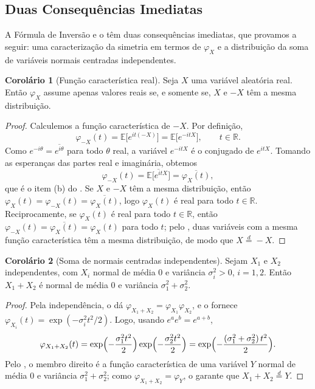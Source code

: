 \documentclass[12pt,portuguese]{article}
\theoremstyle{definition}
\newtheorem{corollary}[corollary]{Corolário}
\theoremstyle{plainexercise}
\theoremstyle{starredexercise}
\theoremstyle{definition}
\begin{document}
\subsection{Duas Consequências Imediatas}\label{subsec:consequencias-inversao}

A Fórmula de Inversão e o  têm duas consequências
imediatas, que provamos a seguir: uma caracterização da simetria em termos de
$\varphi_X$ e a distribuição da soma de variáveis normais centradas
independentes.

\begin{corollary}[Função característica real]\label{cor:fc-real}
Seja $X$ uma variável aleatória real. Então $\varphi_X$ assume apenas valores
reais se, e somente se, $X$ e $-X$ têm a mesma distribuição.
\end{corollary}

\begin{proof}
Calculemos a função característica de $-X$. Por definição,
\[
  \varphi_{-X}(t) = \mathbb{E}\bigl[e^{it(-X)}\bigr]
  = \mathbb{E}\bigl[e^{-itX}\bigr], \qquad t \in \mathbb{R}.
\]
Como $e^{-i\theta} = \overline{e^{i\theta}}$ para todo $\theta$ real,
a variável $e^{-itX}$ é o conjugado de $e^{itX}$. Tomando as esperanças das
partes real e imaginária, obtemos
\[
  \varphi_{-X}(t) = \overline{\mathbb{E}\bigl[e^{itX}\bigr]}
  = \overline{\varphi_X(t)},
\]
que é o item (b) do . Se $X$ e $-X$ têm a mesma
distribuição, então $\varphi_X(t)=\varphi_{-X}(t)=\overline{\varphi_X(t)}$, logo
$\varphi_X(t)$ é real para todo $t\in\mathbb{R}$. Reciprocamente, se
$\varphi_X(t)$ é real para todo $t\in\mathbb{R}$, então
$\varphi_{-X}(t) = \overline{\varphi_X(t)} = \varphi_X(t)$ para todo $t$; pelo
, duas variáveis com a mesma função característica têm
a mesma distribuição, de modo que $X \overset{d}{=} -X$.
\end{proof}

\begin{corollary}[Soma de normais centradas independentes]\label{cor:soma-normais}
Sejam $X_1$ e $X_2$ independentes, com $X_i$ normal de média $0$ e variância
$\sigma_i^2>0$, $i = 1, 2$. Então $X_1 + X_2$ é normal de média $0$ e variância
$\sigma_1^2 + \sigma_2^2$.
\end{corollary}

\begin{proof}
Pela independência, o  dá
$\varphi_{X_1+X_2} = \varphi_{X_1}\varphi_{X_2}$, e o 
fornece $\varphi_{X_i}(t) = \exp(-\sigma_i^2 t^2/2)$. Logo, usando
$e^{a}e^{b} = e^{a+b}$,
\[
  \varphi_{X_1+X_2}(t)
  = \exp\Bigl(-\frac{\sigma_1^2 t^2}{2}\Bigr)
    \exp\Bigl(-\frac{\sigma_2^2 t^2}{2}\Bigr)
  = \exp\Bigl(-\frac{(\sigma_1^2+\sigma_2^2)\,t^2}{2}\Bigr).
\]
Pelo , o membro direito é a função característica de uma
variável $Y$ normal de média $0$ e variância $\sigma_1^2+\sigma_2^2$; como
$\varphi_{X_1+X_2}=\varphi_Y$, o 
garante que $X_1+X_2\overset{d}{=}Y$.
\end{proof}
\end{document}
